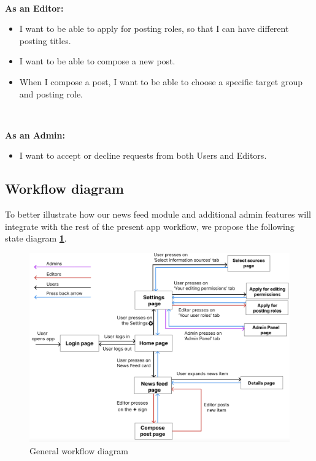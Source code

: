 ~

\textbf{As an Editor:}
\begin{itemize}
    \setlength{\topsep}{0.5pt}
    \setlength{\itemsep}{0.5pt}
    \setlength{\parsep}{0.5pt}
    \item I want to be able to apply for posting roles, so that I can have different posting titles.
    \item I want to be able to compose a new post.
    \item When I compose a post, I want to be able to choose a specific target group and posting role.
\end{itemize}

~

\textbf{As an Admin:}
\begin{itemize}
    \setlength{\topsep}{0.5pt}
    \setlength{\itemsep}{0.5pt}
    \setlength{\parsep}{0.5pt}
    \item I want to accept or decline requests from both Users and Editors.
\end{itemize}

\subsection{Workflow diagram} \label{4:workflow_diagram}

To better illustrate how our news feed module and additional admin features will integrate with the rest of the present app workflow, we propose the following state diagram \textbf{\ref{4:fig:general_workflow}}. 

\begin{figure}[ht]
    \includegraphics[width=\textwidth]{figures/app/miscellanous/general-user-workflow.png}
    \caption{General workflow diagram}
    \label{4:fig:general_workflow}
\end{figure}

